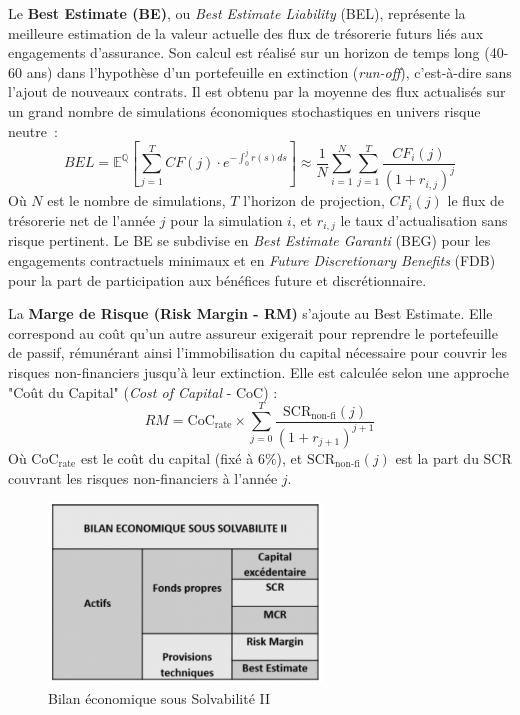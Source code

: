 Le \textbf{Best Estimate (BE)}, ou \textit{Best Estimate Liability} (BEL), représente la meilleure estimation de la valeur actuelle des flux de trésorerie futurs liés aux engagements d'assurance. Son calcul est réalisé sur un horizon de temps long (40-60 ans) dans l'hypothèse d'un portefeuille en extinction (\textit{run-off}), c'est-à-dire sans l'ajout de nouveaux contrats. Il est obtenu par la moyenne des flux actualisés sur un grand nombre de simulations économiques stochastiques en univers risque neutre~:
\begin{equation}
    BEL = \mathbb{E}^{\mathbb{Q}} \left[ \sum_{j=1}^{T} CF(j) \cdot e^{-\int_0^j r(s)ds} \right] \approx \frac{1}{N}\sum_{i=1}^{N}\sum_{j=1}^{T}\frac{CF_{i}(j)}{(1+r_{i,j})^{j}}
\end{equation}
Où $N$ est le nombre de simulations, $T$ l'horizon de projection, $CF_{i}(j)$ le flux de trésorerie net de l'année $j$ pour la simulation $i$, et $r_{i,j}$ le taux d'actualisation sans risque pertinent. Le BE se subdivise en \textit{Best Estimate Garanti} (BEG) pour les engagements contractuels minimaux et en \textit{Future Discretionary Benefits} (FDB) pour la part de participation aux bénéfices future et discrétionnaire.



La \textbf{Marge de Risque (Risk Margin - RM)} s'ajoute au Best Estimate. Elle correspond au coût qu'un autre assureur exigerait pour reprendre le portefeuille de passif, rémunérant ainsi l'immobilisation du capital nécessaire pour couvrir les risques non-financiers jusqu'à leur extinction. Elle est calculée selon une approche "Coût du Capital" (\textit{Cost of Capital} - CoC) :
\begin{equation}
    RM = \text{CoC}_{\text{rate}} \times \sum_{j=0}^{T} \frac{\text{SCR}_{\text{non-fi}}(j)}{(1+r_{j+1})^{j+1}}
\end{equation}
Où $\text{CoC}_{\text{rate}}$ est le coût du capital (fixé à 6\%), et $\text{SCR}_{\text{non-fi}}(j)$ est la part du SCR couvrant les risques non-financiers à l'année $j$.

\begin{figure}[H]
    \centering
    \includegraphics[width=0.65\textwidth]{images/2_chapitres/chapitre1/bilanS2.png}
    \caption{Bilan économique sous Solvabilité II}
    \label{fig:Bilan économique sous Solvabilité II}
\end{figure}


